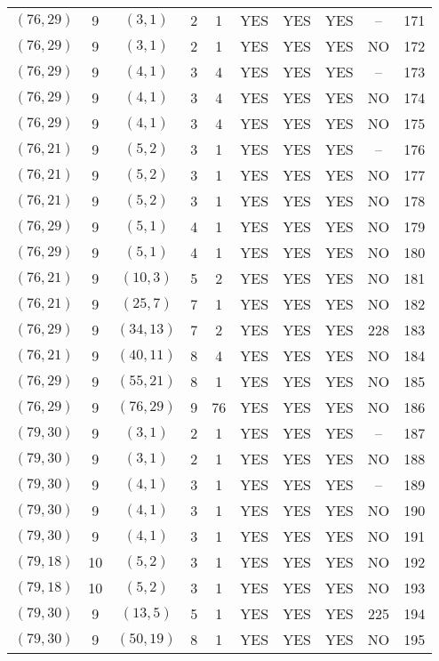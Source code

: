 \begin{longtable}{|c|c|c|c|c|c|c|c|c|c|}
$(76, 29)$ & 9 & $(3, 1)$ & 2 & 1 & YES & YES & YES & -- & 171\\
$(76, 29)$ & 9 & $(3, 1)$ & 2 & 1 & YES & YES & YES & NO & 172\\
$(76, 29)$ & 9 & $(4, 1)$ & 3 & 4 & YES & YES & YES & -- & 173\\
$(76, 29)$ & 9 & $(4, 1)$ & 3 & 4 & YES & YES & YES & NO & 174\\
$(76, 29)$ & 9 & $(4, 1)$ & 3 & 4 & YES & YES & YES & NO & 175\\
$(76, 21)$ & 9 & $(5, 2)$ & 3 & 1 & YES & YES & YES & -- & 176\\
$(76, 21)$ & 9 & $(5, 2)$ & 3 & 1 & YES & YES & YES & NO & 177\\
$(76, 21)$ & 9 & $(5, 2)$ & 3 & 1 & YES & YES & YES & NO & 178\\
$(76, 29)$ & 9 & $(5, 1)$ & 4 & 1 & YES & YES & YES & NO & 179\\
$(76, 29)$ & 9 & $(5, 1)$ & 4 & 1 & YES & YES & YES & NO & 180\\
$(76, 21)$ & 9 & $(10, 3)$ & 5 & 2 & YES & YES & YES & NO & 181\\
$(76, 21)$ & 9 & $(25, 7)$ & 7 & 1 & YES & YES & YES & NO & 182\\
$(76, 29)$ & 9 & $(34, 13)$ & 7 & 2 & YES & YES & YES & 228 & 183\\
$(76, 21)$ & 9 & $(40, 11)$ & 8 & 4 & YES & YES & YES & NO & 184\\
$(76, 29)$ & 9 & $(55, 21)$ & 8 & 1 & YES & YES & YES & NO & 185\\
$(76, 29)$ & 9 & $(76, 29)$ & 9 & 76 & YES & YES & YES & NO & 186\\
$(79, 30)$ & 9 & $(3, 1)$ & 2 & 1 & YES & YES & YES & -- & 187\\
$(79, 30)$ & 9 & $(3, 1)$ & 2 & 1 & YES & YES & YES & NO & 188\\
$(79, 30)$ & 9 & $(4, 1)$ & 3 & 1 & YES & YES & YES & -- & 189\\
$(79, 30)$ & 9 & $(4, 1)$ & 3 & 1 & YES & YES & YES & NO & 190\\
$(79, 30)$ & 9 & $(4, 1)$ & 3 & 1 & YES & YES & YES & NO & 191\\
$(79, 18)$ & 10 & $(5, 2)$ & 3 & 1 & YES & YES & YES & NO & 192\\
$(79, 18)$ & 10 & $(5, 2)$ & 3 & 1 & YES & YES & YES & NO & 193\\
$(79, 30)$ & 9 & $(13, 5)$ & 5 & 1 & YES & YES & YES & 225 & 194\\
$(79, 30)$ & 9 & $(50, 19)$ & 8 & 1 & YES & YES & YES & NO & 195\\

\end{longtable}
